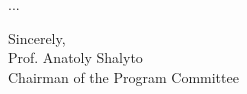 \cleardoublepage
{}

...

\vspace{18pt}
Sincerely,\\
Prof. Anatoly Shalyto\\
Chairman of the Program Committee \\

